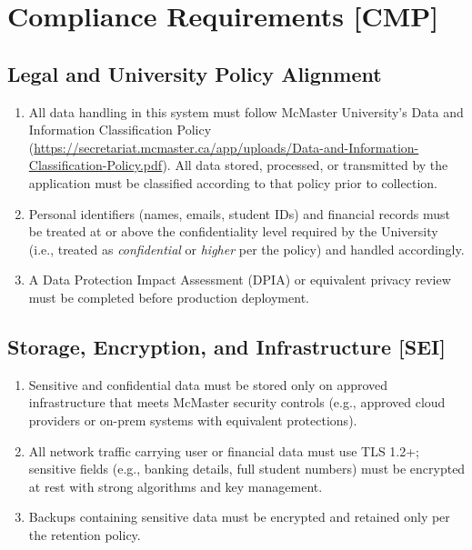 \documentclass[12pt]{article}
\begin{document}
\section{Compliance Requirements [CMP]}

\subsection{Legal and University Policy Alignment}
\begin{enumerate}
  \item All data handling in this system must follow McMaster University's Data and Information Classification Policy (\url{https://secretariat.mcmaster.ca/app/uploads/Data-and-Information-Classification-Policy.pdf}).  All data stored, processed, or transmitted by the application must be classified according to that policy prior to collection.
  \item Personal identifiers (names, emails, student IDs) and financial records must be treated at or above the confidentiality level required by the University (i.e., treated as \textit{confidential} or \textit{higher} per the policy) and handled accordingly.
  \item A Data Protection Impact Assessment (DPIA) or equivalent privacy review must be completed before production deployment.
\end{enumerate}

\subsection{Storage, Encryption, and Infrastructure [SEI]}
\begin{enumerate}
  \item Sensitive and confidential data must be stored only on approved infrastructure that meets McMaster security controls (e.g., approved cloud providers or on-prem systems with equivalent protections).
  \item All network traffic carrying user or financial data must use TLS 1.2+; sensitive fields (e.g., banking details, full student numbers) must be encrypted at rest with strong algorithms and key management.
  \item Backups containing sensitive data must be encrypted and retained only per the retention policy.
\end{enumerate}
\end{document}

